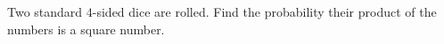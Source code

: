 Two standard $4$-sided dice are rolled. Find the probability their product of the numbers is a square number.
